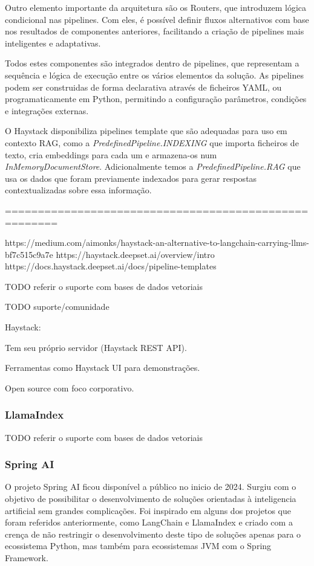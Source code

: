 Outro elemento importante da arquitetura são os Routers, que introduzem lógica condicional nas pipelines. Com eles, é possível definir fluxos alternativos com base nos resultados de componentes anteriores, facilitando a criação de pipelines mais inteligentes e adaptativas.

Todos estes componentes são integrados dentro de pipelines, que representam a sequência e lógica de execução entre os vários elementos da solução. As pipelines podem ser construidas de forma declarativa através de ficheiros YAML, ou programaticamente em Python, permitindo a configuração parâmetros, condições e integrações externas. 

O Haystack disponibiliza pipelines template que são adequadas para uso em contexto RAG, como a \textit{PredefinedPipeline.INDEXING} que importa ficheiros de texto, cria embeddings para cada um e armazena-os num \textit{InMemoryDocumentStore}. Adicionalmente temos a \textit{PredefinedPipeline.RAG} que usa os dados que foram previamente indexados para gerar respostas contextualizadas sobre essa informação. 



======================================================

https://medium.com/aimonks/haystack-an-alternative-to-langchain-carrying-llms-bf7c515c9a7e
https://haystack.deepset.ai/overview/intro
https://docs.haystack.deepset.ai/docs/pipeline-templates


TODO referir o suporte com bases de dados vetoriais

TODO suporte/comunidade


Haystack:

Tem seu próprio servidor (Haystack REST API).

Ferramentas como Haystack UI para demonstrações.

Open source com foco corporativo.


\subsubsection{LlamaIndex}

TODO referir o suporte com bases de dados vetoriais



\subsubsection{Spring AI}


O projeto Spring AI ficou disponível a público no inicio de 2024. Surgiu com o objetivo de possibilitar o desenvolvimento de soluções orientadas à inteligencia artificial sem grandes complicações. Foi inspirado em alguns dos projetos que foram referidos anteriormente, como LangChain e LlamaIndex e criado com a crença de não restringir o desenvolvimento deste tipo de soluções apenas para o ecossistema Python, mas também para ecossistemas JVM com o Spring Framework.

